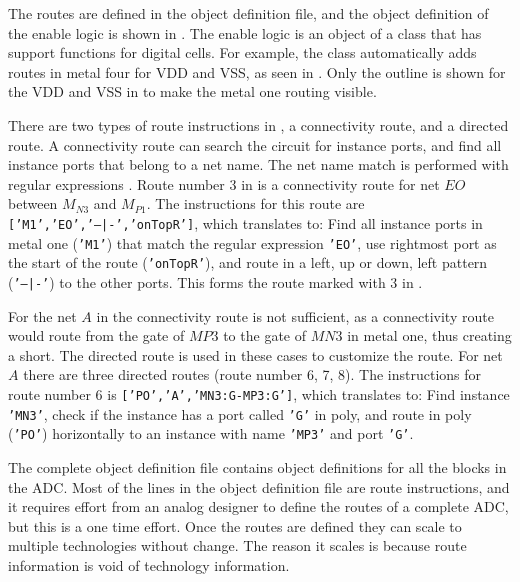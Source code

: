The routes are defined in the object definition file, and the object
definition of the enable logic is shown in
. The enable logic is an object of a class that
has support functions for digital cells. For example, the class automatically adds routes in metal
four for VDD and VSS, as seen in .
Only the
outline is shown for the VDD and VSS in  to make the metal one routing visible.

There are two types of route instructions in ,
a connectivity route, and  a directed
route. A connectivity route can search the circuit for instance ports, and
find all instance ports that belong to a net name. The net name
match is performed with regular expressions
\cite{masterRegex}. Route number 3 in
 is a connectivity route
for net
$EO$ between $M_{N3}$ and $M_{P1}$. The instructions for this route are {\small\texttt{['M1','EO','--|-','onTopR']}}, which
translates to: Find all instance ports in metal one ({\small\texttt{'M1'}}) that match the regular
expression {\small\texttt{'EO'}}, use rightmost port as the start of the route ({\small\texttt{'onTopR'}}),  and route
in a left, up or down, left pattern ({\small\texttt{'--|-'}}) to the other ports. This
forms the route marked with $3$ in .

For the net $A$ in  the connectivity route is
not sufficient, as a connectivity route
would route from the gate of $MP3$ to the gate of $MN3$ in metal one,
thus creating a short. The directed route is used in these cases to
customize the route. For net $A$ there are three directed routes
(route number 6, 7, 8). The instructions for route number 6 is
{\small\texttt{['PO','A','MN3:G-MP3:G']}}, which translates to: Find
instance  {\small\texttt{'MN3'}}, check if the instance has a port
called  {\small\texttt{'G'}} in poly, and route
in poly ({\small\texttt{'PO'}}) horizontally to an instance with name  {\small\texttt{'MP3'}} and port  {\small\texttt{'G'}}.

The complete object definition file contains object definitions for all the blocks in
the ADC. Most of the lines in the object definition file are route
instructions, and it requires effort from an analog designer to
define the routes of a complete ADC, but this is a one time
effort. Once the routes are defined they can scale to multiple
technologies without change. The reason it scales is because route information is void
of technology information.



